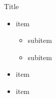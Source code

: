 \documentclass{beamer}
\begin{document}
\begin{frame}{Title}
  \begin{itemize}
    \item item 
    \begin{itemize}
      \item subitem 
      \item subitem 
    \end{itemize}
    \item item
    \item item
  \end{itemize}
\end{frame}
\end{document}
